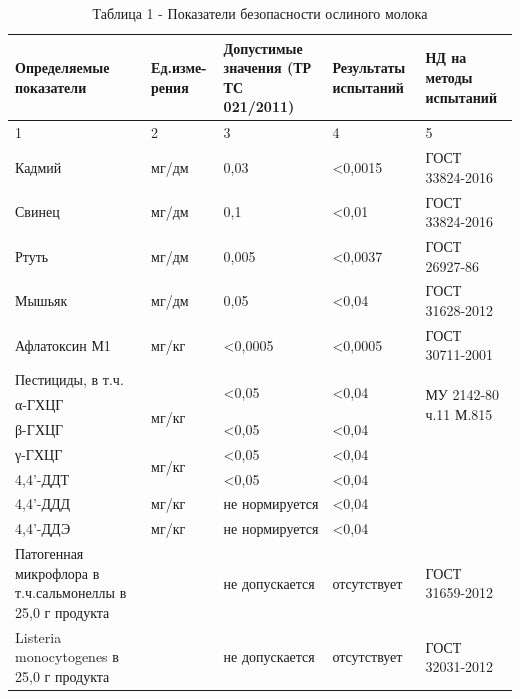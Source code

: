 \begin{table}[H]
\caption*{Таблица 1 - Показатели безопасности ослиного молока}
\centering
\begin{tabular}{|p{}|p{}|p{}|p{}|p{}|}
\hline
Определяемые показатели & Ед.изме-рения & Допустимые значения (ТР ТС 021/2011) & Результаты испытаний & НД на методы испытаний \\ \hline
1 & 2 & 3 & 4 & 5 \\ \hline
Кадмий & мг/дм & 0,03 & \textless{}0,0015 & ГОСТ 33824-2016 \\ \hline
Свинец & мг/дм & 0,1 & \textless{}0,01 & ГОСТ 33824-2016 \\ \hline
Ртуть & мг/дм & 0,005 & \textless{}0,0037 & ГОСТ 26927-86 \\ \hline
Мышьяк & мг/дм & 0,05 & \textless{}0,04 & ГОСТ 31628-2012 \\ \hline
Афлатоксин М1 & мг/кг & \textless{}0,0005 & \textless{}0,0005 & ГОСТ 30711-2001 \\ \hline
Пестициды, в т.ч. &  & \multirow{2}{*}{\textless{}0,05} & \multirow{2}{*}{\textless{}0,04} & \multirow{3}{*}{МУ 2142-80 ч.11 М.815} \\ \cline{1-2}
α-ГХЦГ & \multirow{2}{*}{мг/кг} &  &  &  \\ \cline{1-1} \cline{3-4}
β-ГХЦГ &  & \textless{}0,05 & \textless{}0,04 &  \\ \hline
γ-ГХЦГ & \multirow{2}{*}{мг/кг} & \textless{}0,05 & \textless{}0,04 &  \\ \cline{1-1} \cline{3-5}
4,4'-ДДТ &  & \textless{}0,05 & \textless{}0,04 &  \\ \hline
4,4'-ДДД & мг/кг & не нормируется & \textless{}0,04 & \multirow{2}{*}{} \\ \cline{1-4}
4,4'-ДДЭ & мг/кг & не нормируется & \textless{}0,04 &  \\ \hline
Патогенная микрофлора в т.ч.сальмонеллы в 25,0 г продукта &  & не допускается & отсутствует & ГОСТ 31659-2012 \\ \hline
Listeria monocytogenes в 25,0 г продукта &  & не допускается & отсутствует & ГОСТ 32031-2012 \\ \hline
\end{tabular}
\end{table}

